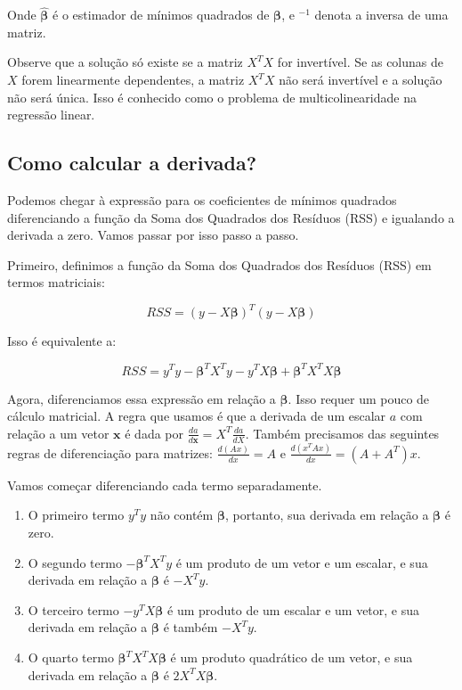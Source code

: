 \documentclass[12pt,a4paper, brazil]{article}
\begin{document}
\noindent Onde $\hat{\boldsymbol{\beta}}$ é o estimador de mínimos quadrados de $\boldsymbol{\beta}$, e $^{-1}$ denota a inversa de uma matriz.

Observe que a solução só existe se a matriz $X^TX$ for invertível. Se as colunas de $X$ forem linearmente dependentes, a matriz $X^TX$ não será invertível e a solução não será única. Isso é conhecido como o problema de multicolinearidade na regressão linear.

\subsection{Como calcular a derivada?}

Podemos chegar à expressão para os coeficientes de mínimos quadrados diferenciando a função da Soma dos Quadrados dos Resíduos (RSS) e igualando a derivada a zero. Vamos passar por isso passo a passo.

Primeiro, definimos a função da Soma dos Quadrados dos Resíduos (RSS) em termos matriciais:

$$RSS = (y - X\boldsymbol{\beta})^T(y - X\boldsymbol{\beta})$$

Isso é equivalente a:

$$RSS = y^Ty - \boldsymbol{\beta}^TX^Ty - y^TX\boldsymbol{\beta} + \boldsymbol{\beta}^TX^TX\boldsymbol{\beta}$$

Agora, diferenciamos essa expressão em relação a $\boldsymbol{\beta}$. Isso requer um pouco de cálculo matricial. A regra que usamos é que a derivada de um escalar $a$ com relação a um vetor $\boldsymbol{x}$ é dada por $\frac{da}{d\boldsymbol{x}} = X^T\frac{da}{dX}$. Também precisamos das seguintes regras de diferenciação para matrizes: $\frac{d(Ax)}{dx} = A$ e $\frac{d(x^TAx)}{dx} = (A + A^T)x$.

Vamos começar diferenciando cada termo separadamente. 
\begin{enumerate}
  \item O primeiro termo $y^Ty$ não contém $\boldsymbol{\beta}$, portanto, sua derivada em relação a $\boldsymbol{\beta}$ é zero.

  \item O segundo termo $-\boldsymbol{\beta}^TX^Ty$ é um produto de um vetor e um escalar, e sua derivada em relação a $\boldsymbol{\beta}$ é $-X^Ty$.
  
  \item O terceiro termo $- y^TX\boldsymbol{\beta}$ é um produto de um escalar e um vetor, e sua derivada em relação a $\boldsymbol{\beta}$ é também $-X^Ty$.
  
  \item O quarto termo $\boldsymbol{\beta}^TX^TX\boldsymbol{\beta}$ é um produto quadrático de um vetor, e sua derivada em relação a $\boldsymbol{\beta}$ é $2X^TX\boldsymbol{\beta}$.
  
\end{enumerate}
\end{document}
